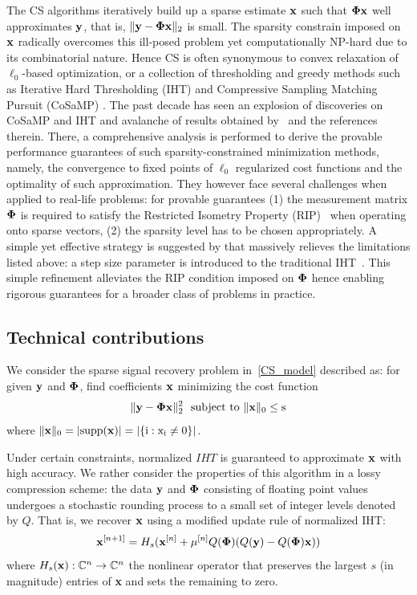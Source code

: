 \documentclass{article}
\begin{document}
The CS algorithms iteratively build up a sparse estimate ${\bf x}$ such that ${\bf \Phi}  {\bf x}$ well approximates ${\bf y}$, that is,  $\| {\bf y}- {\bf \Phi}  {\bf x} \|_2$ is small. The sparsity constrain imposed on ${\bf x}$ radically overcomes this ill-posed problem yet computationally NP-hard due to its combinatorial nature. Hence CS is often synonymous to convex relaxation of $\ell_0$-based optimization, or a collection of thresholding and greedy methods such as Iterative Hard Thresholding (IHT) \cite{blumensath2008iht, blumensath2009iht} and Compressive Sampling Matching Pursuit (CoSaMP) \cite{needel2008cosamp}. The past decade has seen an explosion of discoveries on CoSaMP and IHT and avalanche of results obtained by~\cite{liu2017dualiht, yuan2014ht, yuan2016htp, blumensath2013cs, needel2008cosamp} and the references therein. There, a comprehensive analysis is performed to derive the provable performance guarantees of such sparsity-constrained minimization methods, namely, the convergence to fixed points of $\ell_0$ regularized cost functions and the optimality of such approximation. They however face several challenges when applied to real-life problems: for provable guarantees (1) the measurement matrix ${\bf \Phi}$ is required to satisfy the Restricted Isometry Property (RIP)~\cite{candes2008rip, chartrand2008rip} when operating onto sparse vectors, (2) the sparsity level has to be chosen appropriately. A simple yet effective strategy is suggested by \cite{blumensath2010niht} that massively relieves the limitations listed above: a step size parameter is introduced to the traditional IHT~\cite{blumensath2008iht}. This simple refinement alleviates the RIP condition imposed on ${\bf \Phi}$ hence enabling rigorous guarantees for a broader class of problems in practice. 
\subsection{Technical contributions}
 We consider the sparse signal recovery problem in~\ref{CS_model} described as: for given ${\bf y}$ and ${\bf \Phi}$, find coefficients ${\bf x}$ minimizing the cost function
 \begin{equation}\label{cost_function}
     \|{\bf y} - {\bf \Phi x} \|_2^2 \ \ \rm{subject \ to \ \|{\bf x} \|_0 \leq s}
 \end{equation}
 where $\|{\bf x} \|_0 = |\rm{supp}({\bf x})| = |\{i: x_i\neq 0 \}|$.
 
 Under certain constraints, normalized $IHT$ is guaranteed to approximate ${\bf x}$ with high accuracy. We rather consider the properties of this algorithm in a lossy compression scheme: the data ${\bf y}$ and ${\bf \Phi}$ consisting of floating point values undergoes a stochastic rounding process to a small set of integer levels denoted by $Q$. That is, we recover ${\bf x}$ using a modified update rule of normalized IHT:
 \begin{equation}
     {\bf x}^{[n+1]} = H_s({\bf x}^{[n]} + \mu^{[n]}Q({\bf \Phi})(Q({\bf y}) - Q({\bf \Phi}){\bf x}))
 \end{equation}
where $H_s({\bf x}): \mathbb{C}^n \rightarrow \mathbb{C}^n$ the nonlinear operator that preserves the largest $s$ (in magnitude) entries of {\bf x} and sets the remaining to zero. 
 
\end{document}
